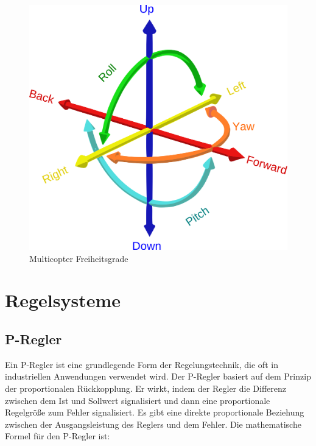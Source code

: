 \begin{figure}[H]
\begin{centering}
    \includegraphics[scale=0.2]{images/multicopter_freiheitsgrade.png}
    
    \caption{\label{fig:freiheitsgrade}Multicopter Freiheitsgrade \cite{imgfreiheitsgrade}}
\end{centering}
\end{figure}
    




\section{Regelsysteme} \label{regelsysteme:section}


    \subsection{P-Regler}
    \label{chp:p-regler}
    
    Ein \ac{P-Regler} ist eine grundlegende Form der Regelungstechnik, die oft in industriellen Anwendungen verwendet wird. Der \ac{P-Regler} basiert auf dem Prinzip der proportionalen Rückkopplung. Er wirkt, indem der Regler die Differenz zwischen dem Ist und Sollwert signalisiert und dann eine proportionale Regelgröße zum Fehler signalisiert.
    Es gibt eine direkte proportionale Beziehung zwischen der Ausgangsleistung des Reglers und dem Fehler. Die mathematische Formel für den P-Regler ist: 

